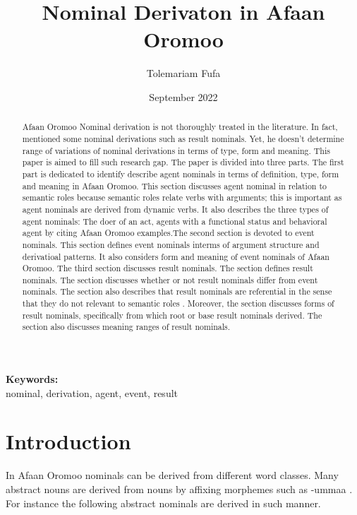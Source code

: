 \documentclass[11pt,a4paper]{article}
\title {Nominal Derivaton in Afaan Oromoo}
\author {Tolemariam Fufa}
\date{September 2022}
\begin{document}
\newcommand\keywords[1]{%
	\begingroup
	\let\and\\
	\par
	\noindent\textbf{Keywords:}\\#1\par
	\endgroup
}
\maketitle
\begin{abstract}
	
	Afaan Oromoo Nominal derivation is not thoroughly treated in the literature. In fact, \cite{temesgen1985} mentioned some nominal derivations such as result nominals. Yet, he doesn’t determine range of variations of nominal derivations in terms of type, form and meaning. This paper is aimed to fill such research gap. The paper is divided into three parts. The first part is dedicated to identify describe agent nominals in terms of definition, type, form and meaning in Afaan Oromoo. This section discusses agent nominal in relation to semantic roles because semantic roles relate verbs with arguments; this is important as agent nominals are derived from dynamic verbs. It also describes the three types of agent nominals: The doer of an act, agents with a functional status and behavioral agent by citing Afaan Oromoo examples.The second section is devoted to event nominals. This section defines event nominals interms of argument structure and derivatioal patterns. It also considers form and meaning of event nominals of Afaan Oromoo. The third section discusses result nominals. The section defines result nominals. The section discusses whether or not result nominals differ from event nominals. The section also describes that result nominals are referential in the sense that they do not relevant to semantic roles \cite{melloni2012event}. Moreover, the section discusses forms of result nominals, specifically from which root or base result nominals derived. The section also discusses meaning ranges of result nominals.\\
		
	
\end{abstract}
\keywords{nominal, derivation, agent, event, result}
\newpage
\section{Introduction}
In Afaan Oromoo nominals can be derived from different word classes. Many abstract nouns are derived from nouns by affixing morphemes such as -ummaa \cite{gaddisa2001,temesgen1985,tolemariam2011}. For instance the following  abstract nominals are derived in such manner. \\
\end{document}
